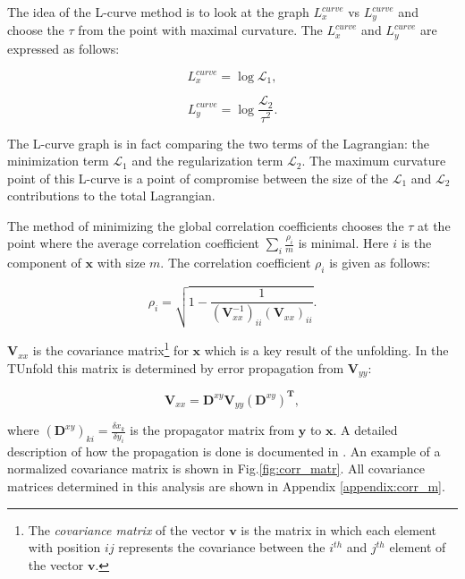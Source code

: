 The idea of the L-curve method is to look at the graph $L_{x}^{curve}$ vs $L_{y}^{curve}$ and choose the $\tau$ from the point with
maximal curvature. The $L_{x}^{curve}$ and $L_{y}^{curve}$ are expressed as follows:

\begin{equation}
 L_{x}^{curve} = \log \mathcal{L}_{1},
\end{equation}

\begin{equation}
 L_{y}^{curve} = \log \frac{\mathcal{L}_{2}}{\tau^{2}}.
\end{equation}

The L-curve graph is in fact comparing the two terms of the Lagrangian: the minimization term $\mathcal{L}_{1}$ and the regularization term $\mathcal{L}_2$.
The maximum curvature point of this L-curve is a point of compromise between the size of the $\mathcal{L}_{1}$ and $\mathcal{L}_{2}$ contributions
to the total Lagrangian.

The method of minimizing the global correlation coefficients chooses the $\tau$ at the point where the average correlation coefficient 
$\sum_{i} \frac{\rho_{i}}{m}$ is minimal. Here $i$ is the component of $\mathbf{x}$ with size $m$. The correlation coefficient $\rho_{i}$ is given as follows:

\begin{equation}
 \rho_{i} = \sqrt{1 - \frac{1}{(\mathbf{V}_{xx}^{-1})_{ii} (\mathbf{V}_{xx})_{ii}}}.
\end{equation}

$\mathbf{V}_{xx}$ is the covariance matrix\footnote{The \textit{covariance matrix} of the vector $\mathbf{v}$ is the matrix in which each element with position 
$ij$ represents the covariance between the $i^{th}$ and $j^{th}$ element of the vector $\mathbf{v}$.} for $\mathbf{x}$ which is a key result of the unfolding. 
In the TUnfold this matrix is determined by error propagation from $\mathbf{V}_{yy}$:

\begin{equation}\label{eq:vxx}
 \mathbf{V}_{xx} = \mathbf{D}^{xy}\mathbf{V}_{yy}(\mathbf{D}^{xy})^{\mathbf{T}},
\end{equation}

where $(\mathbf{D}^{xy})_{ki} = \frac{\delta x_{k}}{\delta y_{i}}$ is the propagator matrix from $\mathbf{y}$ to $\mathbf{x}$. A detailed description
of how the propagation is done is documented in \cite{Schmitt:2012kp}. An example of a normalized covariance matrix is shown in Fig.\ref{fig:corr_matr}.
All covariance matrices determined in this analysis are shown in Appendix \ref{appendix:corr_m}.

